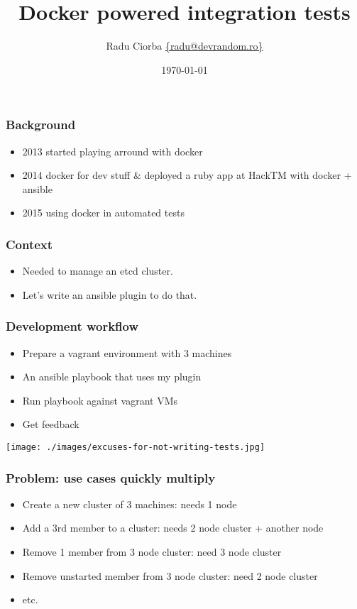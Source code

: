 \documentclass{beamer}
\title[Docker powered integration tests]{Docker powered integration tests} %
\author{Radu Ciorba \href{mailto:radu@devrandom.ro}{\{radu@devrandom.ro\}}} %
\date{\today} %
\begin{document}
\begin{frame}
  \titlepage %
\end{frame}

\begin{frame}
  \frametitle{Background}
  \begin{itemize}
  \item 2013 started playing arround with docker
  \item 2014 docker for dev stuff \& deployed a ruby app at HackTM with docker + ansible
  \item 2015 using docker in automated tests
  \end{itemize}
\end{frame}

\begin{frame}
  \frametitle{Context}
  \begin{itemize}
  \item Needed to manage an etcd cluster.
  \item Let's write an ansible plugin to do that.
  \end{itemize}
\end{frame}

\begin{frame}
  \frametitle{Development workflow}
  \begin{itemize}
  \item Prepare a vagrant environment with 3 machines
  \item An ansible playbook that uses my plugin
  \item Run playbook against vagrant VMs
  \item Get feedback
  \end{itemize}
\end{frame}

\begin{frame}
 \begin{center}
 \texttt{[image: ./images/excuses-for-not-writing-tests.jpg]}
 \end{center}

\end{frame}

\begin{frame}
  \frametitle{Problem: use cases quickly multiply}
  \begin{itemize}
  \item Create a new cluster of 3 machines: needs 1 node
  \item Add a 3rd member to a cluster: needs 2 node cluster + another node 
  \item Remove 1 member from 3 node cluster: need 3 node cluster
  \item Remove unstarted member from 3 node cluster: need 2 node cluster
  \item etc.
  \end{itemize}
\end{frame}
\end{document}
